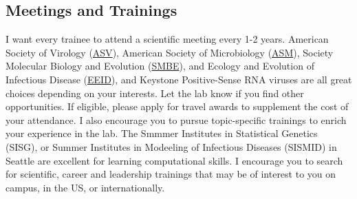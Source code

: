 \documentclass[10pt, a4paper, twocolumn]{article} %
\begin{document}
\subsection{Meetings and Trainings}
I want every trainee to attend a scientific meeting every 1-2 years. American Society of Virology (\href{https://asv.org/}{ASV}), American Society of Microbiology (\href{https://asm.org/}{ASM}), Society Molecular Biology and Evolution (\href{https://smbe.org/smbe/}{SMBE}), and Ecology and Evolution of Infectious Disease (\href{https://www.eeidconference2021.org/}{EEID}), and Keystone Positive-Sense RNA viruses are all great choices depending on your interests. Let the lab know if you find other opportunities. If eligible, please apply for travel awards to supplement the cost of your attendance.\newline
I also encourage you to pursue topic-specific trainings to enrich your experience in the lab. The Smmmer Institutes in Statistical Genetics (SISG), or Summer Institutes in Modeeling of Infectious Diseases (SISMID) in Seattle are excellent for learning computational skills. I encourage you to search for scientific, career and leadership trainings that may be of interest to you on campus, in the US, or internationally.


\printbibliography[title={Bibliography}] %

\end{document}
